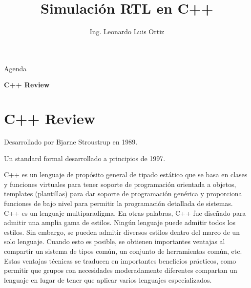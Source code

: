 \documentclass[11pt]{beamer}
\author[LLO]{Ing. Leonardo Luis Ortiz}
\title{Simulación RTL en C++}
\institute[]{Instituto Balseiro \par Centro Atómico Bariloche}
\date{}
\begin{document}
	
	\begin{frame}
		\titlepage
	\end{frame}
	
	\begin{frame}{Agenda}
		\tableofcontents 
	\end{frame}
	
\begin{frame}
	\centering	
	\huge{\textbf{C++ Review}}
\end{frame}	
	
	\section{C++ Review}
	\begin{frame}
		
		\small
		Desarrollado por Bjarne Stroustrup en 1989.
		\vspace{0.5cm}
		
		Un standard formal desarrollado a principios de 1997.
		\vspace{0.5cm}
		
		C++ es un lenguaje de propósito general de tipado estático que se basa en clases y funciones virtuales para tener soporte de programación orientada a objetos, templates (plantillas) para dar soporte de programación genérica y proporciona funciones de bajo nivel para permitir la programación detallada de sistemas.\\
		\vspace{0.5cm}
		C++ es un lenguaje multiparadigma. En otras palabras, C++ fue diseñado para admitir una amplia gama de estilos. Ningún lenguaje puede admitir todos los estilos. Sin embargo, se pueden admitir diversos estilos dentro del marco de un solo lenguaje. Cuando esto es posible, se obtienen importantes ventajas al compartir un sistema de tipos común, un conjunto de herramientas común, etc. Estas ventajas técnicas se traducen en importantes beneficios prácticos, como permitir que grupos con necesidades moderadamente diferentes compartan un lenguaje en lugar de tener que aplicar varios lenguajes especializados.
		
		
	\end{frame}
	
\end{document}

